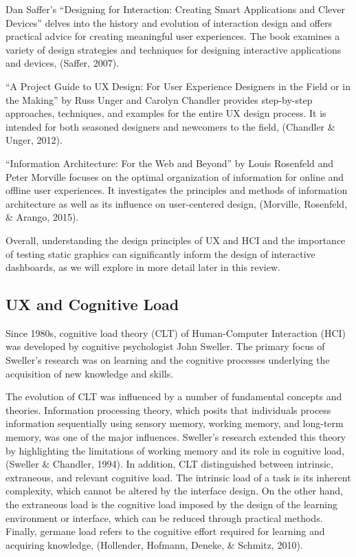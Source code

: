 \documentclass[print]{nuthesis}
\begin{document}
Dan Saffer's ``Designing for Interaction: Creating Smart Applications and Clever Devices'' delves into the history and evolution of interaction design and offers practical advice for creating meaningful user experiences.
The book examines a variety of design strategies and techniques for designing interactive applications and devices, (Saffer, 2007).

``A Project Guide to UX Design: For User Experience Designers in the Field or in the Making'' by Russ Unger and Carolyn Chandler provides step-by-step approaches, techniques, and examples for the entire UX design process.
It is intended for both seasoned designers and newcomers to the field, (Chandler \& Unger, 2012).

``Information Architecture: For the Web and Beyond'' by Louis Rosenfeld and Peter Morville focuses on the optimal organization of information for online and offline user experiences.
It investigates the principles and methods of information architecture as well as its influence on user-centered design, (Morville, Rosenfeld, \& Arango, 2015).

Overall, understanding the design principles of UX and HCI and the importance of testing static graphics can significantly inform the design of interactive dashboards, as we will explore in more detail later in this review.

\hypertarget{ux-and-cognitive-load}{%
\subsection{UX and Cognitive Load}\label{ux-and-cognitive-load}}

Since 1980s, cognitive load theory (CLT) of Human-Computer Interaction (HCI) was developed by cognitive psychologist John Sweller.
The primary focus of Sweller's research was on learning and the cognitive processes underlying the acquisition of new knowledge and skills.

The evolution of CLT was influenced by a number of fundamental concepts and theories.
Information processing theory, which posits that individuals process information sequentially using sensory memory, working memory, and long-term memory, was one of the major influences.
Sweller's research extended this theory by highlighting the limitations of working memory and its role in cognitive load, (Sweller \& Chandler, 1994).
In addition, CLT distinguished between intrinsic, extraneous, and relevant cognitive load.
The intrinsic load of a task is its inherent complexity, which cannot be altered by the interface design.
On the other hand, the extraneous load is the cognitive load imposed by the design of the learning environment or interface, which can be reduced through practical methods.
Finally, germane load refers to the cognitive effort required for learning and acquiring knowledge, (Hollender, Hofmann, Deneke, \& Schmitz, 2010).
\end{document}
